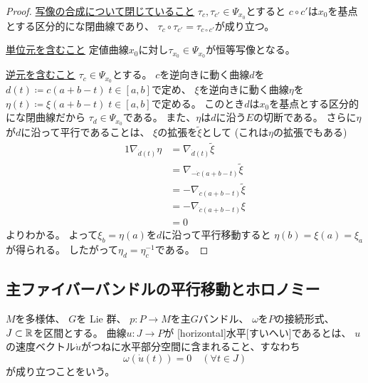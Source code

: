 \documentclass[report]{jlreq}
\begin{document}
\begin{proof}
    \uline{写像の合成について閉じていること} \quad
    $\tau_c, \tau_{c'} \in \Psi_{x_0}$とすると
    $c \circ c'$は$x_0$を基点とする区分的に{\smooth}な閉曲線であり、
    $\tau_c \circ \tau_{c'} = \tau_{c \circ c'}$が成り立つ。

    \uline{単位元を含むこと} \quad
    定値曲線$x_0$に対し$\tau_{x_0} \in \Psi_{x_0}$が恒等写像となる。

    \uline{逆元を含むこと} \quad
    $\tau_c \in \Psi_{x_0}$とする。
    $c$を逆向きに動く曲線$d$を
    $d(t) \coloneqq c(a + b - t) \; t \in [a, b]$で定め、
    $\xi$を逆向きに動く曲線$\eta$を
    $\eta(t) \coloneqq \xi(a + b - t) \; t \in [a, b]$で定める。
    このとき$d$は$x_0$を基点とする区分的に{\smooth}な閉曲線だから
    $\tau_d \in \Psi_{x_0}$である。
    また、$\eta$は$d$に沿う$E$の切断である。
    さらに$\eta$が$d$に沿って平行であることは、
    $\xi$の拡張を$\widetilde{\xi}$として
    (これは$\eta$の拡張でもある)
    \begin{alignat}{1}
        \nabla_{\dot{d}(t)} \eta
            &= \nabla_{\dot{d}(t)} \widetilde{\xi} \\
            &= \nabla_{- \dot{c}(a + b - t)} \widetilde{\xi} \\
            &= - \nabla_{\dot{c}(a + b - t)} \widetilde{\xi} \\
            &= - \nabla_{\dot{c}(a + b - t)} \xi \\
            &= 0
    \end{alignat}
    よりわかる。
    よって$\xi_b = \eta(a)$を$d$に沿って平行移動すると
    $\eta(b) = \xi(a) = \xi_a$が得られる。
    したがって$\eta_d = \eta_c^{-1}$である。
\end{proof}

%

\subsection{主ファイバーバンドルの平行移動とホロノミー}

\begin{definition}[水平な曲線]
    $M$を多様体、
    $G$を Lie 群、
    $p \colon P \to M$を主$G$バンドル、
    $\omega$を$P$の接続形式、
    $J \subset \mathbb{R}$を区間とする。
    {\smooth}曲線$u \colon J \to P$が
    [horizontal]{水平}[すいへい]であるとは、
    $u$の速度ベクトル$\dot{u}$がつねに水平部分空間に含まれること、すなわち
    \begin{equation}
        \omega(\dot{u}(t)) = 0
            \quad (\forall t \in J)
    \end{equation}
    が成り立つことをいう。
\end{definition}
\end{document}

